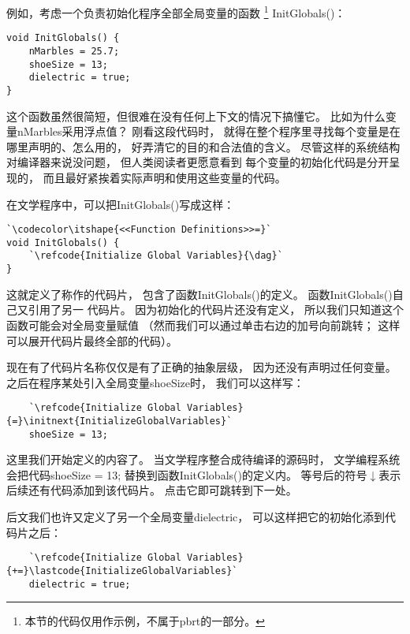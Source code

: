 例如，考虑一个负责初始化程序全部全局变量的函数
\footnote{本节的代码仅用作示例，不属于pbrt的一部分。}
{\ttfamily InitGlobals()}：
\begin{lstlisting}
void InitGlobals() {
    nMarbles = 25.7;
    shoeSize = 13;
    dielectric = true;
}
\end{lstlisting}

这个函数虽然很简短，但很难在没有任何上下文的情况下搞懂它。
比如为什么变量{\ttfamily nMarbles}采用浮点值？
刚看这段代码时，
就得在整个程序里寻找每个变量是在哪里声明的、怎么用的，
好弄清它的目的和合法值的含义。
尽管这样的系统结构对编译器来说没问题，
但人类阅读者更愿意看到
每个变量的初始化代码是分开呈现的，
而且最好紧挨着实际声明和使用这些变量的代码。

在文学程序中，可以把{\ttfamily InitGlobals()}写成这样：
\begin{lstlisting}
`\codecolor\itshape{<<Function Definitions>>=}`
void InitGlobals() {
    `\refcode{Initialize Global Variables}{\dag}`
}
\end{lstlisting}

这就定义了称作的代码片，
包含了函数{\ttfamily InitGlobals()}的定义。
函数{\ttfamily InitGlobals()}自己又引用了另一
代码片。
因为初始化的代码片还没有定义，
所以我们只知道这个函数可能会对全局变量赋值
（然而我们可以通过单击右边的加号向前跳转；
这样可以展开代码片最终全部的代码）。

现在有了代码片名称仅仅是有了正确的抽象层级，
因为还没有声明过任何变量。
之后在程序某处引入全局变量{\ttfamily shoeSize}时，
我们可以这样写：
\begin{lstlisting}
    `\refcode{Initialize Global Variables}{=}\initnext{InitializeGlobalVariables}`
    shoeSize = 13;
\end{lstlisting}

这里我们开始定义的内容了。
当文学程序整合成待编译的源码时，
文学编程系统会把代码{\ttfamily shoeSize = 13;}
替换到函数{\ttfamily InitGlobals()}的定义内。
等号后的符号{\codecolor $\downarrow$}表示后续还有代码添加到该代码片。
点击它即可跳转到下一处。

后文我们也许又定义了另一个全局变量{\ttfamily dielectric}，
可以这样把它的初始化添到代码片之后：
\begin{lstlisting}
    `\refcode{Initialize Global Variables}{+=}\lastcode{InitializeGlobalVariables}`
    dielectric = true;
\end{lstlisting}


